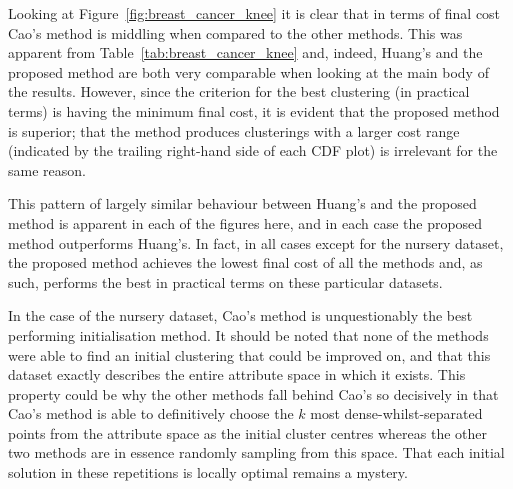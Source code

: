 \documentclass[smallextended]{svjour3}
\begin{document}
Looking at Figure~\ref{fig:breast_cancer_knee} it is clear that in terms of
final cost Cao's method is middling when compared to the other methods. This
was apparent from Table~\ref{tab:breast_cancer_knee} and, indeed, Huang's and
the proposed method are both very comparable when looking at the main body of
the results. However, since the criterion for the best clustering (in practical
terms) is having the minimum final cost, it is evident that the proposed method
is superior; that the method produces clusterings with a larger cost
range (indicated by the trailing right-hand side of each CDF plot) is irrelevant
for the same reason.

This pattern of largely similar behaviour between Huang's and the proposed
method is apparent in each of the figures here, and in each case the proposed
method outperforms Huang's. In fact, in all cases except for the nursery
dataset, the proposed method achieves the lowest final cost of all the methods
and, as such, performs the best in practical terms on these particular datasets.

In the case of the nursery dataset, Cao's method is unquestionably the best
performing initialisation method. It should be noted that none of the
methods were able to find an initial clustering that could be improved on, and
that this dataset exactly describes the entire attribute space in which it
exists. This property could be why the other methods fall behind Cao's so
decisively in that Cao's method is able to definitively choose the \(k\) most
dense-whilst-separated points from the attribute space as the initial cluster
centres whereas the other two methods are in essence randomly sampling from this
space. That each initial solution in these repetitions is locally optimal
remains a mystery.
\end{document}
